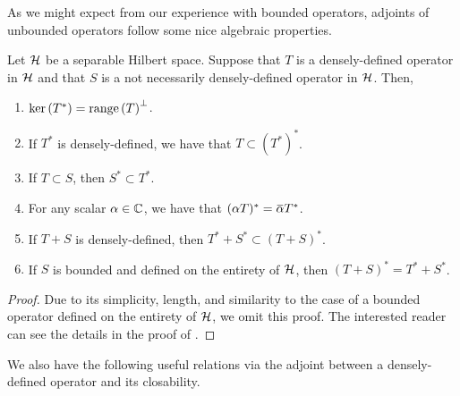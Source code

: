 As we might expect from our experience with bounded operators, adjoints of unbounded operators follow some nice algebraic properties.

\begin{proposition}\label{lbl_prop_properties_of_adjoints}
  Let $\mathcal{H}$ be a separable Hilbert space. Suppose that $T$ is a densely-defined operator in $\mathcal{H}$ and that $S$ is a not necessarily densely-defined operator in $\mathcal{H}$. Then,
  \begin{enumerate}[label = (\alph*)]
    \item $\operatorname{ker}\left(T^*\right) = \operatorname{range}\left(T\right)^\perp$.
    \item If $T^*$ is densely-defined, we have that $T \subset (T^*)^*$.
    \item If $T \subset S$, then $S^* \subset T^*$.
    \item For any scalar $\alpha \in \mathbb{C}$, we have that $(\alpha T)^* = \conjugate{\alpha} T^*$.
    \item If $T+S$ is densely-defined, then $T^* + S^* \subset (T + S)^*$.
    \item If $S$ is bounded and defined on the entirety of $\mathcal{H}$, then $(T + S)^* = T^* + S^*$.
  \end{enumerate}
\end{proposition}
\begin{proof}
  Due to its simplicity, length, and similarity to the case of a bounded operator defined on the entirety of $\mathcal{H}$, we omit this proof. The interested reader can see the details in the proof of {\cite[Proposition 1.6]{konrad}}.
\end{proof}

We also have the following useful relations via the adjoint between a densely-defined operator and its closability.

